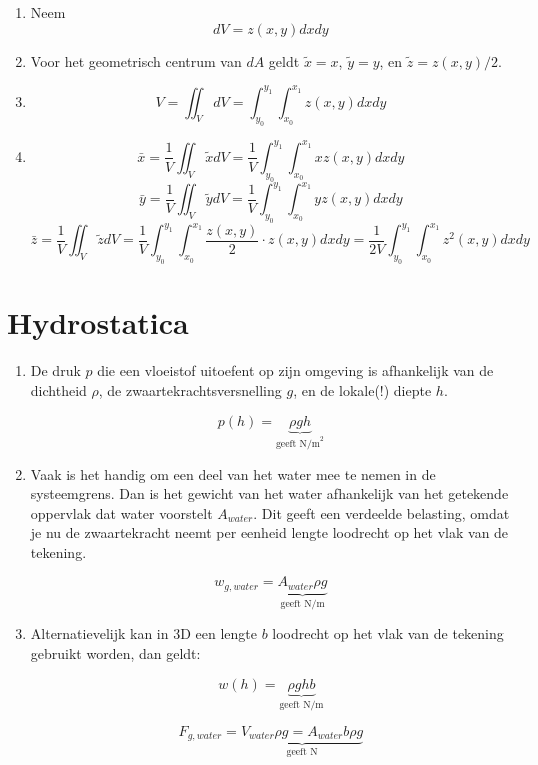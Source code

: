 \documentclass{article}
\begin{document}
\begin{enumerate}
\begin{enumerate}
    \item Neem $$dV = z(x, y) dx dy$$
    \item Voor het geometrisch centrum van $dA$ geldt $\tilde{x}= x$, $\tilde{y}= y$, en $\tilde{z}= z(x,y)/2$.
    \item $$V = \iint_V dV = \int_{y_0}^{y_1}\int_{x_0}^{x_1}z(x, y) dx dy$$

    \item $$\bar{x} = \frac{1}{V}\iint_V \tilde{x}dV = \frac{1}{V} \int_{y_0}^{y_1}\int_{x_0}^{x_1}xz(x, y) dx dy$$
$$\bar{y} = \frac{1}{V}\iint_V \tilde{y}dV = \frac{1}{V} \int_{y_0}^{y_1}\int_{x_0}^{x_1}yz(x, y) dx dy$$
$$\bar{z} = \frac{1}{V}\iint_V \tilde{z}dV = \frac{1}{V} \int_{y_0}^{y_1}\int_{x_0}^{x_1}\frac{z(x, y)}{2}\cdot z(x, y) dx dy = \frac{1}{2V} \int_{y_0}^{y_1}\int_{x_0}^{x_1} z^2(x, y) dx dy $$
\end{enumerate}

\end{enumerate}

\section{Hydrostatica}


\begin{enumerate}
    \item De druk $p$ die een vloeistof uitoefent op zijn omgeving is afhankelijk van de dichtheid $\rho$, de zwaartekrachtsversnelling $g$, en de lokale(!) diepte $h$.

$$p(h) = \underbrace{\rho g h}_{\text{geeft N/m}^2}$$

\item Vaak is het handig om een deel van het water mee te nemen in de systeemgrens. Dan is het gewicht van het water afhankelijk van het getekende oppervlak dat water voorstelt $A_{water}$. Dit geeft een verdeelde belasting, omdat je nu de zwaartekracht neemt per eenheid lengte loodrecht op het vlak van de tekening.

$$w_{g,water} = \underbrace{A_{water}\rho g}_{\text{geeft N/m}}$$

\item Alternatievelijk kan in 3D een lengte $b$ loodrecht op het vlak van de tekening gebruikt worden, dan geldt:

$$w(h) = \underbrace{\rho g h b}_{\text{geeft N/m}}$$

$$F_{g,water} = \underbrace{V_{water}\rho g = A_{water}b\rho g}_{\text{geeft N}}$$

\end{enumerate}
\end{document}
